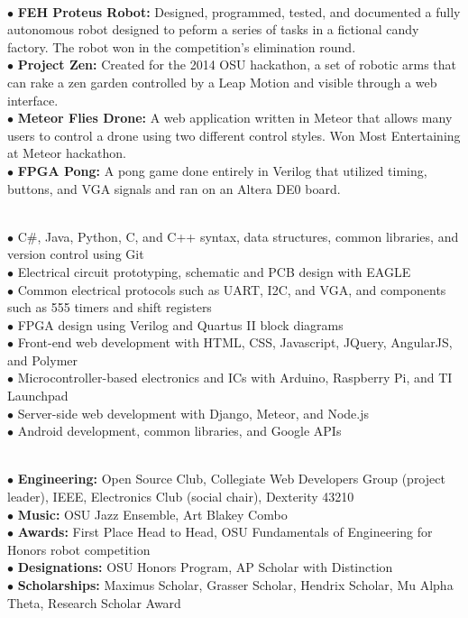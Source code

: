 \documentclass[10pt]{article}
\begin{document}
\\
$\bullet$ {\bf FEH Proteus Robot:} Designed, programmed, tested, and documented a fully autonomous robot designed to peform a series of tasks in a fictional candy factory. The robot won in the competition's elimination round.\\
$\bullet$ {\bf Project Zen:} Created for the 2014 OSU hackathon, a set of robotic arms that can rake a zen garden controlled by a Leap Motion and visible through a web interface.\\
$\bullet$ {\bf Meteor Flies Drone:} A web application written in Meteor that allows many users to control a drone using two different control styles. Won Most Entertaining at Meteor hackathon.\\
$\bullet$ {\bf FPGA Pong:} A pong game done entirely in Verilog that utilized timing, buttons, and VGA signals and ran on an Altera DE0 board.
\medskip

\\
$\bullet$ C\#, Java, Python, C, and C++ syntax, data structures, common libraries, and version control using Git\\
$\bullet$ Electrical circuit prototyping, schematic and PCB design with EAGLE\\
$\bullet$ Common electrical protocols such as UART, I2C, and VGA, and components such as 555 timers and shift registers\\
$\bullet$ FPGA design using Verilog and Quartus II block diagrams\\
$\bullet$ Front-end web development with HTML, CSS, Javascript, JQuery, AngularJS, and Polymer\\
$\bullet$ Microcontroller-based electronics and ICs with Arduino, Raspberry Pi, and TI Launchpad\\
$\bullet$ Server-side web development with Django, Meteor, and Node.js\\
$\bullet$ Android development, common libraries, and Google APIs
\medskip

\\
$\bullet$ {\bf Engineering:} Open Source Club, Collegiate Web Developers Group (project leader), IEEE, Electronics Club (social chair), Dexterity 43210\\
$\bullet$ {\bf Music:} OSU Jazz Ensemble, Art Blakey Combo\\
$\bullet$ {\bf Awards:} First Place Head to Head, OSU Fundamentals of Engineering for Honors robot competition\\
$\bullet$ {\bf Designations:} OSU Honors Program, AP Scholar with Distinction\\
$\bullet$ {\bf Scholarships:} Maximus Scholar, Grasser Scholar, Hendrix Scholar, Mu Alpha Theta, Research Scholar Award
\medskip
\end{document}
